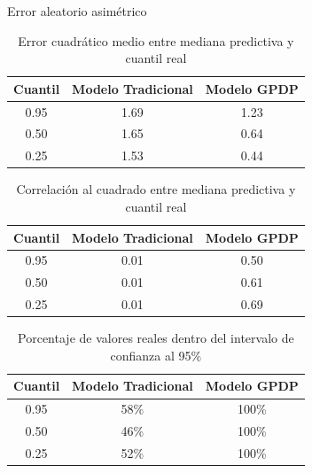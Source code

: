 \documentclass{beamer}
\begin{document}
\begin{frame}{Error aleatorio asim\'etrico}

\begin{scriptsize}

\begin{table}[H]
    \centering
    \caption{Error cuadr\'atico medio entre mediana predictiva y cuantil real}
    \begin{tabular}{ccc}
    \hline
    Cuantil & Modelo Tradicional & Modelo GPDP \\ 
    \hline
    0.95 & 1.69 & 1.23 \\ 
    0.50 & 1.65 & 0.64 \\ 
    0.25 & 1.53 & 0.44 \\
    \hline
    \end{tabular}
\end{table}
\begin{table}[H]
    \centering
    \caption{Correlaci\'on al cuadrado entre mediana predictiva y cuantil real} 
    \begin{tabular}{ccc}
    \hline
    Cuantil & Modelo Tradicional & Modelo GPDP \\ 
    \hline
    0.95 & 0.01 & 0.50 \\ 
    0.50 & 0.01 & 0.61 \\ 
    0.25 & 0.01 & 0.69 \\ 
    \hline
    \end{tabular}
\end{table}

\begin{table}[H]
    \centering
    \caption{Porcentaje de valores reales dentro del intervalo de confianza al 95$\%$} 
    \begin{tabular}{ccc}
    \hline
    Cuantil & Modelo Tradicional & Modelo GPDP \\ 
    \hline
    0.95 & 58\% & 100\% \\ 
    0.50 & 46\% & 100\% \\ 
    0.25 & 52\% & 100\% \\ 
    \hline
    \end{tabular}
\end{table}

\end{scriptsize}
\end{frame}

\end{document}

